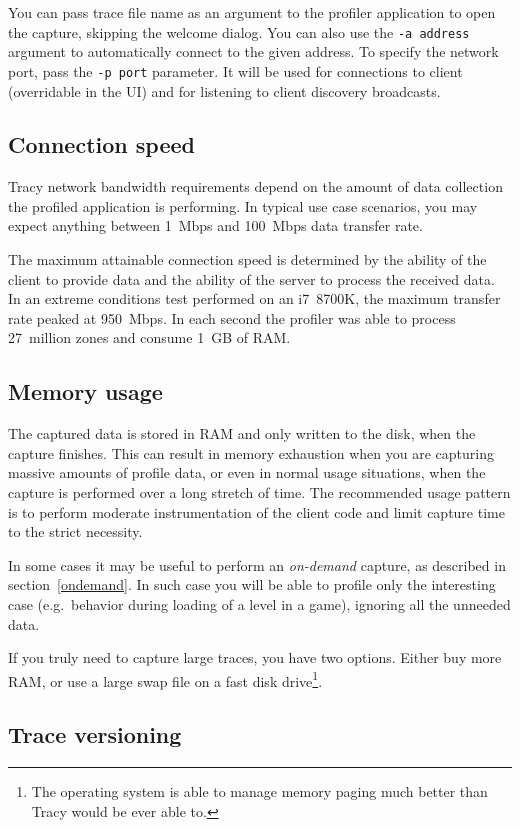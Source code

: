 \documentclass[hidelinks,titlepage,a4paper]{article}
\begin{document}
You can pass trace file name as an argument to the profiler application to open the capture, skipping the welcome dialog. You can also use the \texttt{-a address} argument to automatically connect to the given address. To specify the network port, pass the \texttt{-p port} parameter. It will be used for connections to client (overridable in the UI) and for listening to client discovery broadcasts.

\subsection{Connection speed}

Tracy network bandwidth requirements depend on the amount of data collection the profiled application is performing. In typical use case scenarios, you may expect anything between 1~Mbps and 100~Mbps data transfer rate.

The maximum attainable connection speed is determined by the ability of the client to provide data and the ability of the server to process the received data. In an extreme conditions test performed on an i7~8700K, the maximum transfer rate peaked at 950~Mbps. In each second the profiler was able to process 27~million zones and consume 1~GB of RAM.

\subsection{Memory usage}

The captured data is stored in RAM and only written to the disk, when the capture finishes. This can result in memory exhaustion when you are capturing massive amounts of profile data, or even in normal usage situations, when the capture is performed over a long stretch of time. The recommended usage pattern is to perform moderate instrumentation of the client code and limit capture time to the strict necessity.

In some cases it may be useful to perform an \emph{on-demand} capture, as described in section~\ref{ondemand}. In such case you will be able to profile only the interesting case (e.g.\ behavior during loading of a level in a game), ignoring all the unneeded data.

If you truly need to capture large traces, you have two options. Either buy more RAM, or use a large swap file on a fast disk drive\footnote{The operating system is able to manage memory paging much better than Tracy would be ever able to.}.

\subsection{Trace versioning}
\end{document}

